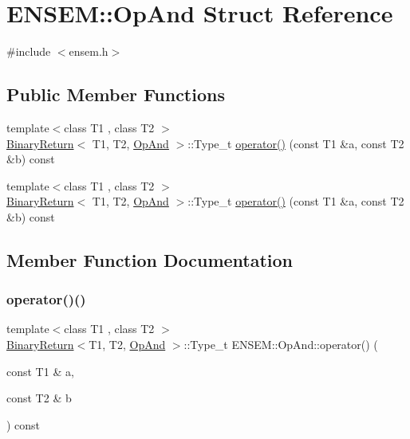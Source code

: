 \hypertarget{structENSEM_1_1OpAnd}{}\section{E\+N\+S\+EM\+:\+:Op\+And Struct Reference}
\label{structENSEM_1_1OpAnd}


{\ttfamily \#include $<$ensem.\+h$>$}

\subsection*{Public Member Functions}
\begin{DoxyCompactItemize}
\item 
{\footnotesize template$<$class T1 , class T2 $>$ }\\\mbox{\hyperlink{structENSEM_1_1BinaryReturn}{Binary\+Return}}$<$ T1, T2, \mbox{\hyperlink{structENSEM_1_1OpAnd}{Op\+And}} $>$\+::Type\+\_\+t \mbox{\hyperlink{structENSEM_1_1OpAnd_a05e5e9860556ea062a49cdb289806548}{operator()}} (const T1 \&a, const T2 \&b) const
\item 
{\footnotesize template$<$class T1 , class T2 $>$ }\\\mbox{\hyperlink{structENSEM_1_1BinaryReturn}{Binary\+Return}}$<$ T1, T2, \mbox{\hyperlink{structENSEM_1_1OpAnd}{Op\+And}} $>$\+::Type\+\_\+t \mbox{\hyperlink{structENSEM_1_1OpAnd_a05e5e9860556ea062a49cdb289806548}{operator()}} (const T1 \&a, const T2 \&b) const
\end{DoxyCompactItemize}


\subsection{Member Function Documentation}
\mbox{\label{structENSEM_1_1OpAnd_a05e5e9860556ea062a49cdb289806548}} 
\subsubsection{\texorpdfstring{operator()()}{operator()()}\hspace{0.1cm}{\footnotesize\ttfamily [1/2]}}
{\footnotesize\ttfamily template$<$class T1 , class T2 $>$ \\
\mbox{\hyperlink{structENSEM_1_1BinaryReturn}{Binary\+Return}}$<$T1, T2, \mbox{\hyperlink{structENSEM_1_1OpAnd}{Op\+And}} $>$\+::Type\+\_\+t E\+N\+S\+E\+M\+::\+Op\+And\+::operator() (\begin{DoxyParamCaption}\item[{const T1 \&}]{a,  }\item[{const T2 \&}]{b }\end{DoxyParamCaption}) const\hspace{0.3cm}{\ttfamily [inline]}}


